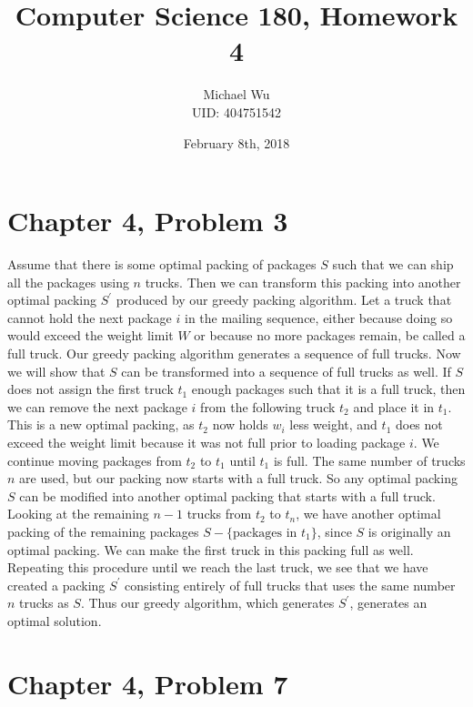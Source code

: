 \documentclass[12pt]{article}
\begin{document}
\title{Computer Science 180, Homework 4}
\date{February 8th, 2018}
\author{Michael Wu\\UID: 404751542}
\maketitle

\section*{Chapter 4, Problem 3}

Assume that there is some optimal packing of packages \(S\) such that we can ship all the packages using \(n\)
trucks. Then we can transform this packing into another optimal packing \(S^\prime\) produced by our greedy packing
algorithm. Let a truck that cannot hold the next package \(i\) in the mailing sequence, either because doing so would exceed the weight
limit \(W\) or because no more packages remain, be called a full truck. Our greedy packing algorithm generates a
sequence of full trucks. Now we will show that \(S\) can be transformed into a sequence of full trucks as well. If \(S\)
does not assign the first truck \(t_1\) enough packages such that it is a full truck, then we can remove the next package
\(i\) from the following truck \(t_2\) and place it in \(t_1\). This is a new optimal packing, as \(t_2\) now holds \(w_i\)
less weight, and \(t_1\) does not exceed the weight limit because it was not full prior to loading package \(i\). We continue moving packages
from \(t_2\) to \(t_1\) until \(t_1\) is full. The same number of trucks \(n\) are used, but our packing now starts with a full truck. So
any optimal packing \(S\) can be modified into another optimal packing that starts with a full truck. Looking at the remaining \(n-1\) trucks from
\(t_2\) to \(t_n\), we have another optimal packing of the remaining packages \(S-\{\text{packages in }t_1\}\), since \(S\) is originally an
optimal packing. We can make the first truck in this packing full as well. Repeating this procedure until we reach the last truck, we see that we
have created a packing \(S^\prime\) consisting entirely of full trucks that uses the same number \(n\) trucks as \(S\). Thus our greedy
algorithm, which generates \(S^\prime\), generates an optimal solution.

\pagebreak

\section*{Chapter 4, Problem 7}
\end{document}
